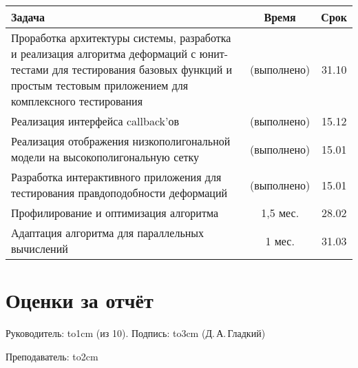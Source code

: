 \documentclass[a4paper, 14pt, titlepage]{extarticle}
\newcommand{\underscore}[1]{\hbox to#1{\hrulefill}}
\newcommand{\eng}[1]{{\English #1}}
\begin{document}
    \begin{center}
      \begin{tabular}{|p{10.3cm}|c|c|}\hline
        Задача                                       & Время         & Срок  \\\hline\hline
        Проработка архитектуры системы, разработка и реализация алгоритма деформаций
        с юнит-тестами для тестирования базовых функций и простым тестовым приложением
        для комплексного тестирования                & (выполнено)   & 31.10 \\\hline
        Реализация интерфейса \eng{callback}'ов & (выполнено)   & 15.12 \\\hline
        Реализация отображения низкополигональной
        модели на высокополигональную сетку          & (выполнено)   & 15.01 \\\hline
        Разработка интерактивного приложения для
        тестирования правдоподобности деформаций     & (выполнено)   & 15.01 \\\hline
        Профилирование и оптимизация алгоритма       & 1,5 мес.      & 28.02 \\\hline
        Адаптация алгоритма для параллельных
        вычислений                                   & 1 мес.        & 31.03 \\\hline
      \end{tabular}
    \end{center}

  \section{Оценки за отчёт}

    Руководитель: \underscore{1cm} (из 10). Подпись: \underscore{3cm} (Д.\,А.\,Гладкий)

    \vspace{0.5cm}
    Преподаватель: \underscore{2cm}

  
\end{document}
